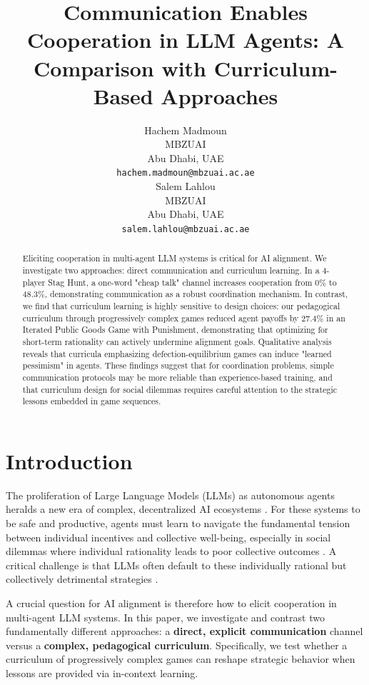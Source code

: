 \documentclass[11pt]{article}
\title{Communication Enables Cooperation in LLM Agents: A Comparison with Curriculum-Based Approaches}
\author{Hachem Madmoun \\
  MBZUAI \\ Abu Dhabi, UAE \\
  \texttt{hachem.madmoun@mbzuai.ac.ae} \\\And
  Salem Lahlou \\
  MBZUAI \\ Abu Dhabi, UAE \\
  \texttt{salem.lahlou@mbzuai.ac.ae} \\}
\begin{document}
\maketitle


\begin{abstract}
Eliciting cooperation in multi-agent LLM systems is critical for AI alignment. We investigate two approaches: direct communication and curriculum learning. In a 4-player Stag Hunt, a one-word "cheap talk" channel increases cooperation from 0\% to 48.3\%, demonstrating communication as a robust coordination mechanism. In contrast, we find that curriculum learning is highly sensitive to design choices: our pedagogical curriculum through progressively complex games reduced agent payoffs by 27.4\% in an Iterated Public Goods Game with Punishment, demonstrating that optimizing for short-term rationality can actively undermine alignment goals. Qualitative analysis reveals that curricula emphasizing defection-equilibrium games can induce "learned pessimism" in agents. These findings suggest that for coordination problems, simple communication protocols may be more reliable than experience-based training, and that curriculum design for social dilemmas requires careful attention to the strategic lessons embedded in game sequences.
\end{abstract}

\section{Introduction}

The proliferation of Large Language Models (LLMs) as autonomous agents heralds a new era of complex, decentralized AI ecosystems \citep{sun2025survey, wooldridge2009introduction, turing2025trends}. For these systems to be safe and productive, agents must learn to navigate the fundamental tension between individual incentives and collective well-being, especially in social dilemmas where individual rationality leads to poor collective outcomes \citep{osborne2004introduction}. A critical challenge is that LLMs often default to these individually rational but collectively detrimental strategies \citep{payne2025fingerprints, pnas2024ai_behavioral_science}. 

A crucial question for AI alignment is therefore how to elicit cooperation in multi-agent LLM systems. In this paper, we investigate and contrast two fundamentally different approaches: a \textbf{direct, explicit communication} channel versus a \textbf{complex, pedagogical curriculum}. Specifically, we test whether a curriculum of progressively complex games can reshape strategic behavior when lessons are provided via in-context learning.
\end{document}
